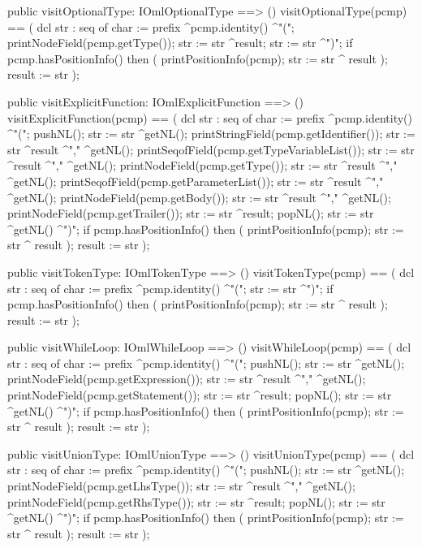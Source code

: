\begin{vdm_al}
  public visitOptionalType: IOmlOptionalType ==> ()
  visitOptionalType(pcmp) ==
    ( dcl str : seq of char := prefix ^pcmp.identity() ^"(";
      printNodeField(pcmp.getType());
      str := str ^result;
      str := str ^")";
      if pcmp.hasPositionInfo()
      then ( printPositionInfo(pcmp);
             str := str ^ result );
      result := str );

  public visitExplicitFunction: IOmlExplicitFunction ==> ()
  visitExplicitFunction(pcmp) ==
    ( dcl str : seq of char := prefix ^pcmp.identity() ^"(";
      pushNL();
      str := str ^getNL();
      printStringField(pcmp.getIdentifier());
      str := str ^result ^"," ^getNL();
      printSeqofField(pcmp.getTypeVariableList());
      str := str ^result ^"," ^getNL();
      printNodeField(pcmp.getType());
      str := str ^result ^"," ^getNL();
      printSeqofField(pcmp.getParameterList());
      str := str ^result ^"," ^getNL();
      printNodeField(pcmp.getBody());
      str := str ^result ^"," ^getNL();
      printNodeField(pcmp.getTrailer());
      str := str ^result;
      popNL();
      str := str ^getNL() ^")";
      if pcmp.hasPositionInfo()
      then ( printPositionInfo(pcmp);
             str := str ^ result );
      result := str );

  public visitTokenType: IOmlTokenType ==> ()
  visitTokenType(pcmp) ==
    ( dcl str : seq of char := prefix ^pcmp.identity() ^"(";
      str := str ^")";
      if pcmp.hasPositionInfo()
      then ( printPositionInfo(pcmp);
             str := str ^ result );
      result := str );

  public visitWhileLoop: IOmlWhileLoop ==> ()
  visitWhileLoop(pcmp) ==
    ( dcl str : seq of char := prefix ^pcmp.identity() ^"(";
      pushNL();
      str := str ^getNL();
      printNodeField(pcmp.getExpression());
      str := str ^result ^"," ^getNL();
      printNodeField(pcmp.getStatement());
      str := str ^result;
      popNL();
      str := str ^getNL() ^")";
      if pcmp.hasPositionInfo()
      then ( printPositionInfo(pcmp);
             str := str ^ result );
      result := str );

  public visitUnionType: IOmlUnionType ==> ()
  visitUnionType(pcmp) ==
    ( dcl str : seq of char := prefix ^pcmp.identity() ^"(";
      pushNL();
      str := str ^getNL();
      printNodeField(pcmp.getLhsType());
      str := str ^result ^"," ^getNL();
      printNodeField(pcmp.getRhsType());
      str := str ^result;
      popNL();
      str := str ^getNL() ^")";
      if pcmp.hasPositionInfo()
      then ( printPositionInfo(pcmp);
             str := str ^ result );
      result := str );


\end{vdm_al}
